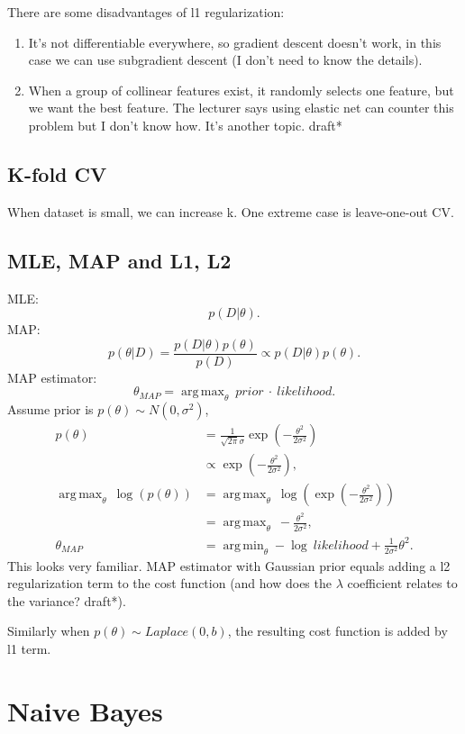 \documentclass{report}
\DeclareMathOperator*{\argmax}{arg\,max}
\DeclareMathOperator*{\argmin}{arg\,min}
\begin{document}
There are some disadvantages of l1 regularization:
\begin{enumerate}
	\item It's not differentiable everywhere, so gradient descent doesn't work, in this case we can use subgradient descent (I don't need to know the details).
	\item When a group of collinear features exist, it randomly selects one feature, but we want the best feature. The lecturer says using elastic net can counter this problem but I don't know how. It's another topic. draft*
\end{enumerate}

\section{K-fold CV}
When dataset is small, we can increase k. One extreme case is leave-one-out CV.

\section{MLE, MAP and L1, L2}
MLE: \[
	p(D|\theta)
.\] 
MAP:
\[
	p(\theta|D) = \frac{p(D|\theta)p(\theta)}{p(D)} \propto p(D|\theta)p(\theta)
.\] 
MAP estimator: \[
	\theta_{MAP} = \argmax_{\theta}\ prior\ \cdot\ likelihood
.\] 
Assume prior is $p(\theta) \sim N(0, \sigma^2)$,
\begin{align*}
	p(\theta) &= \frac{1}{\sqrt{2\pi} \sigma} \exp \left( -\frac{\theta^2}{2\sigma^2} \right) \\
		  &\propto \exp \left( -\frac{
		  \theta^2}{2\sigma^2} \right), \\
		  \argmax_{\theta}\ \log(p(\theta)) &= \argmax_{\theta}\ \log \left( \exp \left( -\frac{\theta^2}{2\sigma^2} \right) \right) \\ 
 &= \argmax_{\theta}\ -\frac{\theta^2}{2\sigma^2}, \\
		  \theta_{MAP} &= \argmin_{\theta} - \log \ likelihood +  \frac{1}{2\sigma^2} \theta^2
.\end{align*}
This looks very familiar. MAP estimator with Gaussian prior equals adding a l2 regularization term to the cost function (and how does the $\lambda$ coefficient relates to the variance? draft*).

Similarly when $p(\theta) \sim Laplace(0, b)$, the resulting cost function is added by l1 term.

\chapter{Naive Bayes}
\end{document}
